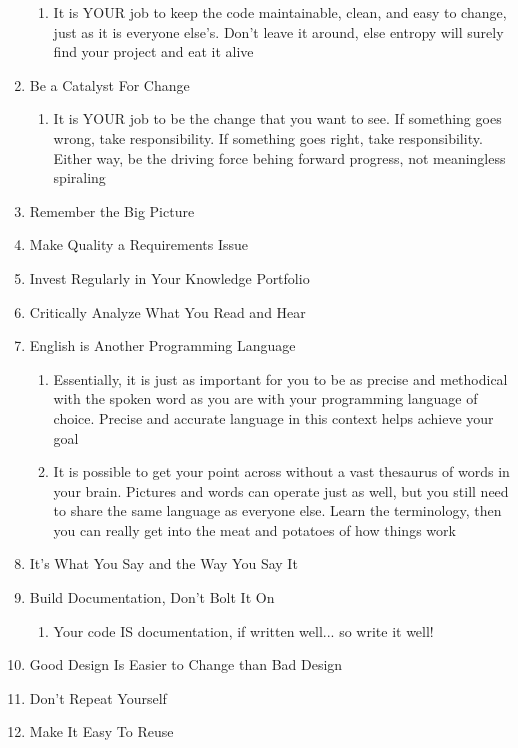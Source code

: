 \documentclass{article}
\begin{document}
\begin{enumerate}
\begin{enumerate}
            \item It is YOUR job to keep the code maintainable, clean, and easy to change, just as it is everyone else's. Don't leave it around, else entropy will surely find your project and eat it alive
        \end{enumerate}
    \item Be a Catalyst For Change
        \begin{enumerate}
            \item It is YOUR job to be the change that you want to see. If something goes wrong, take responsibility. If something goes right, take responsibility. Either way, be the driving force behing forward progress, not meaningless spiraling
        \end{enumerate}
    \item Remember the Big Picture
    \item Make Quality a Requirements Issue
    \item Invest Regularly in Your Knowledge Portfolio
    \item Critically Analyze What You Read and Hear
    \item English is Another Programming Language
        \begin{enumerate}
            \item Essentially, it is just as important for you to be as precise and methodical with the spoken word as you are with your programming language of choice. Precise and accurate language in this context helps achieve your goal
            \item It is possible to get your point across without a vast thesaurus of words in your brain. Pictures and words can operate just as well, but you still need to share the same language as everyone else. Learn the terminology, then you can really get into the meat and potatoes of how things work
        \end{enumerate}
    \item It's What You Say and the Way You Say It
    \item Build Documentation, Don't Bolt It On
        \begin{enumerate}
            \item Your code IS documentation, if written well... so write it well!
        \end{enumerate}
    \item Good Design Is Easier to Change than Bad Design
    \item Don't Repeat Yourself
    \item Make It Easy To Reuse

\end{enumerate}
\end{document}
